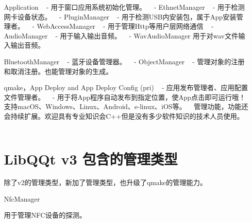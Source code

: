 \begin{DoxyItemize}
\item Application ~\newline
 -\/ 用于窗口应用系统初始化管理。 ~\newline
-\/ Ethnet\+Manager ~\newline
 -\/ 用于检测网卡设备状态。 ~\newline
-\/ Plugin\+Manager ~\newline
 -\/ 用于检测\+U\+S\+B内安装包，属于\+App安装管理者。 ~\newline
-\/ Web\+Access\+Manager ~\newline
 -\/ 用于管理\+Http等用户层网络通信 ~\newline
-\/ Audio\+Manager ~\newline
 -\/ 用于输入输出音频。 ~\newline
 -\/ Wav\+Audio\+Manager 用于对wav文件输入输出音频。
\item Bluetooth\+Manager ~\newline
 -\/ 蓝牙设备管理器。 ~\newline
-\/ Object\+Manager ~\newline
 -\/ 管理对象的注册和取消注册。也能管理对象的生成。 ~\newline

\end{DoxyItemize}
\begin{DoxyEnumerate}
\item qmake，\+App Deploy and App Deploy Config (pri) ~\newline
 -\/ 应用发布管理者、应用配置文件管理者。 ~\newline
 -\/ 用于将\+App程序自动发布到指定位置，使\+App点击即可运行哦！支持mac\+O\+S、\+Windows、\+Linux、\+Android、e-\/linux、i\+O\+S等。 ~\newline
 管理功能，功能还会持续扩展。欢迎具有专业知识会\+C++但是没有多少软件知识的技术人员使用。 ~\newline
 \section*{Lib\+Q\+Qt v3 包含的管理类型}
\end{DoxyEnumerate}

除了v2的管理类型，新加了管理类型，也升级了qmake的管理能力。
\begin{DoxyItemize}
\item Nfc\+Manager
\begin{DoxyItemize}
\item 用于管理\+N\+F\+C设备的探测。 
\end{DoxyItemize}
\end{DoxyItemize}